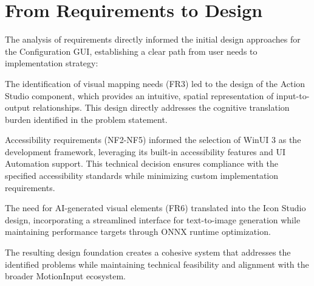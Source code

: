 \section{From Requirements to Design}
The analysis of requirements directly informed the initial design approaches for the Configuration GUI, establishing a clear path from user needs to implementation strategy:

The identification of visual mapping needs (FR3) led to the design of the Action Studio component, which provides an intuitive, spatial representation of input-to-output relationships. This design directly addresses the cognitive translation burden identified in the problem statement.

Accessibility requirements (NF2-NF5) informed the selection of WinUI 3 as the development framework, leveraging its built-in accessibility features and UI Automation support. This technical decision ensures compliance with the specified accessibility standards while minimizing custom implementation requirements.

The need for AI-generated visual elements (FR6) translated into the Icon Studio design, incorporating a streamlined interface for text-to-image generation while maintaining performance targets through ONNX runtime optimization.

The resulting design foundation creates a cohesive system that addresses the identified problems while maintaining technical feasibility and alignment with the broader MotionInput ecosystem.
